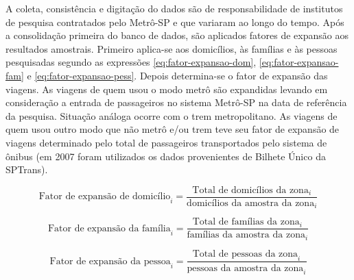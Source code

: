 A coleta, consistência e digitação do dados são de responsabilidade de institutos de pesquisa contratados pelo Metrô-SP e que variaram ao longo do tempo. Após a consolidação primeira do banco de dados, são aplicados fatores de expansão aos resultados amostrais. Primeiro aplica-se aos domicílios, às famílias e às pessoas pesquisadas segundo as expressões \eqref{eq:fator-expansao-dom}, \eqref{eq:fator-expansao-fam} e \eqref{eq:fator-expansao-pess}. Depois determina-se o fator de expansão das viagens. As viagens de quem usou o modo metrô são expandidas levando em consideração a entrada de passageiros no sistema Metrô-SP na data de referência da pesquisa. Situação análoga ocorre com o trem metropolitano. As viagens de quem usou outro modo que não metrô e/ou trem teve seu fator de expansão de viagens determinado pelo total de passageiros transportados pelo sistema de ônibus (em 2007 foram utilizados os dados provenientes de Bilhete Único da SPTrans).

\begin{equation}\label{eq:fator-expansao-dom}
\mbox{Fator de expansão de domicílio}_i = \frac{\mbox{Total de domicílios da zona}_i}{\mbox{domicílios da amostra da zona}_i}
\end{equation}


\begin{equation}\label{eq:fator-expansao-fam}
\mbox{Fator de expansão da família}_i = \frac{\mbox{Total de famílias da zona}_i}{\mbox{famílias da amostra da zona}_i}
\end{equation}

\begin{equation}\label{eq:fator-expansao-pess}
\mbox{Fator de expansão da pessoa}_i = \frac{\mbox{Total de pessoas da zona}_i}{\mbox{pessoas da amostra da zona}_i}
\end{equation}

